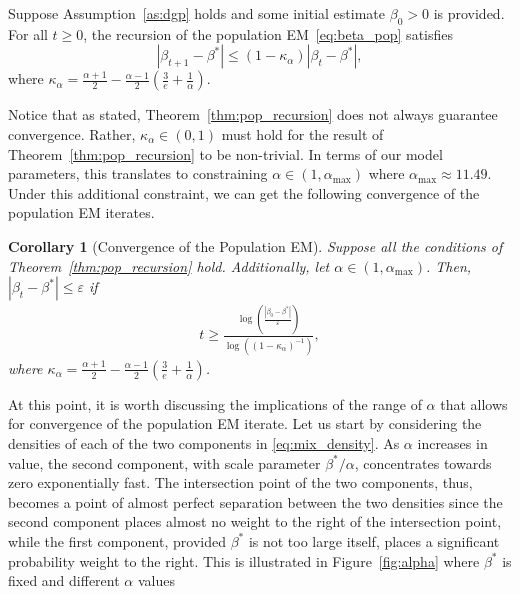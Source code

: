 \documentclass[runningheads]{llncs}
\newtheorem{cor}[theorem]{Corollary}
\begin{document}
\begin{theorem}
  \label{thm:pop_recursion}
  Suppose Assumption~\ref{as:dgp} holds and some initial estimate $\beta_{0}>0$ is provided.
    For all $t \geq 0$, the recursion of the population EM~\eqref{eq:beta_pop} satisfies
    \begin{equation*}
        |\beta_{t+1} - \beta^*| \leq (1-\kappa_{\alpha})|\beta_t-\beta^*|,
    \end{equation*}
    where $\kappa_\alpha = \frac{\alpha+1}{2} - \frac{\alpha-1}{2}\left(\frac{3}{e} + \frac{1}{\alpha} \right)$.
\end{theorem}
Notice that as stated, Theorem~\ref{thm:pop_recursion} does not always guarantee
convergence. Rather, $\kappa_{\alpha} \in (0, 1)$ must hold for the result of
Theorem~\ref{thm:pop_recursion} to be non-trivial.
In terms of our model parameters, this translates to constraining $\alpha \in (1, \alpha_{\max})$
where $\alpha_{\max} \approx 11.49$. Under this additional constraint, we can
get the following convergence of the population EM iterates.
\begin{cor}[Convergence of the Population EM]
  \label{cor:pop_conv}
  Suppose all the conditions of Theorem~\ref{thm:pop_recursion} hold.
  Additionally, let $\alpha \in (1, \alpha_{\max})$. Then,
  $|\beta_t - \beta^*| \leq \varepsilon$
  if
  \begin{align*}
    t \geq
    \frac{\log\left(\frac{|\beta_0-\beta^*|}{\varepsilon}\right)}
    {\log ((1-\kappa_{\alpha})^{-1})},
  \end{align*}
  where $\kappa_\alpha = \frac{\alpha+1}{2} - \frac{\alpha-1}{2}\left(\frac{3}{e} + \frac{1}{\alpha} \right)$.
\end{cor}
At this point, it is worth discussing the implications of the range of $\alpha$
that allows for convergence of the population EM iterate.
Let us start by considering the densities of each of the two components in
\eqref{eq:mix_density}. As $\alpha$ increases in value, the second
component, with scale parameter $\beta^*/\alpha$, concentrates towards zero
exponentially fast. The intersection point of the two components, thus, becomes
a point of almost perfect separation between the two densities since the second
component places almost no weight to the right of the intersection point, while
the first component, provided $\beta^*$ is not too large itself, places a
significant probability weight to the right. This is illustrated in
Figure~\ref{fig:alpha} where $\beta^*$ is fixed and different $\alpha$ values
\end{document}

